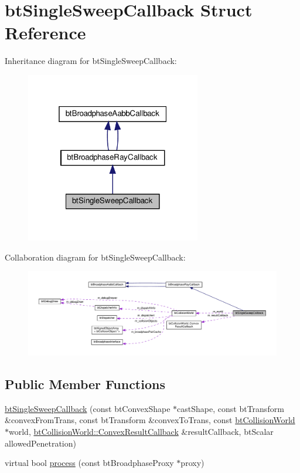 \hypertarget{structbtSingleSweepCallback}{}\section{bt\+Single\+Sweep\+Callback Struct Reference}
\label{structbtSingleSweepCallback}


Inheritance diagram for bt\+Single\+Sweep\+Callback\+:
\nopagebreak
\begin{figure}[H]
\begin{center}
\leavevmode
\includegraphics[width=217pt]{structbtSingleSweepCallback__inherit__graph}
\end{center}
\end{figure}


Collaboration diagram for bt\+Single\+Sweep\+Callback\+:
\nopagebreak
\begin{figure}[H]
\begin{center}
\leavevmode
\includegraphics[width=350pt]{structbtSingleSweepCallback__coll__graph}
\end{center}
\end{figure}
\subsection*{Public Member Functions}
\begin{DoxyCompactItemize}
\item 
\hyperlink{structbtSingleSweepCallback_adb99242209085f3562005a5a0c088793}{bt\+Single\+Sweep\+Callback} (const bt\+Convex\+Shape $\ast$cast\+Shape, const bt\+Transform \&convex\+From\+Trans, const bt\+Transform \&convex\+To\+Trans, const \hyperlink{classbtCollisionWorld}{bt\+Collision\+World} $\ast$world, \hyperlink{structbtCollisionWorld_1_1ConvexResultCallback}{bt\+Collision\+World\+::\+Convex\+Result\+Callback} \&result\+Callback, bt\+Scalar allowed\+Penetration)
\item 
virtual bool \hyperlink{structbtSingleSweepCallback_a38b90d239e96c18b3843435976b598fc}{process} (const bt\+Broadphase\+Proxy $\ast$proxy)
\end{DoxyCompactItemize}

